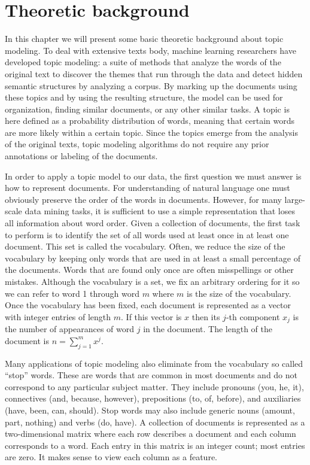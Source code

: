 \documentclass[12pt]{report}
\begin{document}
\section{Theoretic background}
\label{theoretic}
In this chapter we will present some basic theoretic background about
topic modeling. To deal with extensive texts body, machine learning 
researchers have developed topic modeling:
a suite of methods that analyze the words of the original text to
discover the themes that run through the data and detect hidden
semantic structures by analyzing a corpus. By marking up the documents
using these topics and by using the resulting structure, the model can
be used for organization, finding similar documents, or any other
similar tasks. A topic is here defined as a probability distribution
of words, meaning that certain words are more likely within a certain
topic. Since the topics emerge from the analysis of the original
texts, topic modeling algorithms do not require any prior annotations
or labeling of the documents\cite{Blei11introductionto}.

In order to apply a topic model to our data, the first question we must answer
is how to represent documents. For understanding of natural language one must
obviously preserve the order of the words in documents. However, for many
large-scale data mining tasks, it is sufficient to use a simple representation
that loses all information about word order. Given a collection of documents,
the first task to perform is to identify the set of all words used at least
once in at least one document. This set is called the vocabulary. Often, we
reduce the size of the vocabulary by keeping only words that are used in at
least a small percentage of the documents. Words that are found only once are
often misspellings or other mistakes. Although the vocabulary is a set, we fix
an arbitrary ordering for it so we can refer to word 1 through word $m$ where
$m$ is the size of the vocabulary. Once the vocabulary has been fixed, each
document is represented as a vector with integer entries of length $m$. If this
vector is $x$ then its $j$-th component $x_j$ is the number of appearances of
word $j$ in the document. The length of the document is $n=\sum\limits_{j=1}^m
x^j$.

Many applications of topic modeling also eliminate from the vocabulary so
called “stop” words. These are words that are common in most documents and do
not correspond to any particular subject matter. They include pronouns (you,
he, it), connectives (and, because, however), prepositions (to, of, before),
and auxiliaries (have, been, can, should). Stop words may also include generic
nouns (amount, part, nothing) and verbs (do, have). A collection of documents
is represented as a two-dimensional matrix where each row describes a document
and each column corresponds to a word. Each entry in this matrix is an integer
count; most entries are zero. It makes sense to view each column as a feature.
\end{document}

